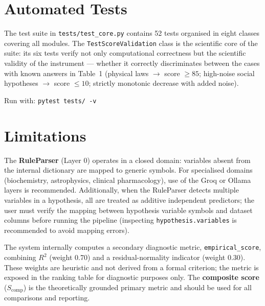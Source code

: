 \documentclass[12pt,a4paper]{article}
\begin{document}
\section{Automated Tests}

The test suite in \texttt{tests/test\_core.py} contains 52 tests organised in eight
classes covering all modules. The \texttt{TestScoreValidation} class is the scientific
core of the suite: its six tests verify not only computational correctness but
the scientific validity of the instrument --- whether it correctly discriminates
between the cases with known answers in Table~1 (physical laws $\to$ score $\geq 85$;
high-noise social hypotheses $\to$ score $\leq 10$; strictly monotonic decrease with
added noise).

Run with: \texttt{pytest tests/ -v}

\section{Limitations}

The \textbf{RuleParser} (Layer 0) operates in a closed domain: variables absent from
the internal dictionary are mapped to generic symbols. For specialised domains
(biochemistry, astrophysics, clinical pharmacology), use of the Groq or Ollama
layers is recommended. Additionally, when the RuleParser detects multiple
variables in a hypothesis, all are treated as additive independent predictors;
the user must verify the mapping between hypothesis variable symbols and dataset
columns before running the pipeline (inspecting \texttt{hypothesis.variables} is
recommended to avoid mapping errors).

The system internally computes a secondary diagnostic metric, \texttt{empirical\_score},
combining $R^2$ (weight 0.70) and a residual-normality indicator (weight 0.30).
These weights are heuristic and not derived from a formal criterion; the metric
is exposed in the ranking table for diagnostic purposes only. The \textbf{composite
score} ($S_{\text{comp}}$) is the theoretically grounded primary metric and
should be used for all comparisons and reporting.
\end{document}
